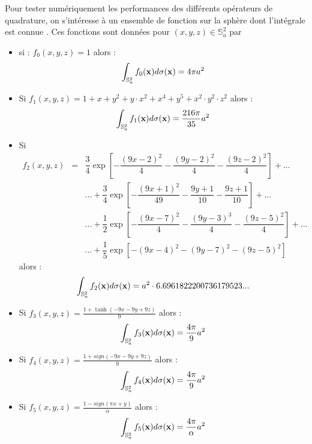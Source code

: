 Pour tester numériquement les performances des différents opérateurs de quadrature, on s’intéresse à un ensemble de fonction sur la sphère dont l'intégrale est connue \cite{Fornberg2014}. Ces fonctions sont données pour $(x,y,z) \in \mathbb{S}_a^2$ par
\begin{itemize}
\item si : $f_0(x,y,z)=1$ alors :
\begin{equation}
\displaystyle\int_{\mathbb{S}_a^2} f_0(\mathbf{x}) d\sigma (\mathbf{x})=4 \pi a^2
\end{equation}
\item Si $f_1(x,y,z)=1+x+y^2+y\cdot x^2+x^4+y^5+x^2 \cdot y^2 \cdot z^2$ alors :
\begin{equation}
\displaystyle\int_{\mathbb{S}_a^2} f_1(\mathbf{x}) d\sigma (\mathbf{x})=\dfrac{216 \pi}{35} a^2
\end{equation}
\item Si 
\begin{equation}
\begin{array}{rcl}
f_2(x,y,z) & = & \dfrac{3}{4} \exp \left[ - \dfrac{(9x-2)^2}{4} - \dfrac{(9y-2)^2}{4} - \dfrac{(9z-2)^2}{4} \right] + ...\\
& & ... + \dfrac{3}{4} \exp \left[ - \dfrac{(9x+1)^2}{49} - \dfrac{9y+1}{10} - \dfrac{9z+1}{10} \right] + ...\\
& & ... + \dfrac{1}{2} \exp \left[ - \dfrac{(9x-7)^2}{4} - \dfrac{(9y-3)^3}{4} - \dfrac{(9z-5)^2}{4} \right] + ...\\
& &... + \dfrac{1}{5} \exp \left[ - (9x-4)^2 - (9y-7)^2 - (9z-5)^2 \right]
\end{array}
\end{equation}
alors :
\begin{equation}
\displaystyle\int_{\mathbb{S}_a^2} f_2(\mathbf{x}) d\sigma (\mathbf{x})=a^2 \cdot 6.6961822200736179523...
\end{equation}
\item Si $f_3(x,y,z)=\frac{1+\tanh(-9x-9y+9z)}{9}$ alors :
\begin{equation}
\displaystyle\int_{\mathbb{S}_a^2} f_3(\mathbf{x}) d\sigma (\mathbf{x})=\frac{4\pi}{9} a^2
\end{equation}
\item Si $f_4(x,y,z)=\frac{1+sign(-9x-9y+9z)}{9}$ alors :
\begin{equation}
\displaystyle\int_{\mathbb{S}_a^2} f_4(\mathbf{x}) d\sigma (\mathbf{x})=\frac{4\pi}{9} a^2
\end{equation}
\item Si $f_5(x,y,z)=\frac{1-sign(\pi x + y)}{\alpha}$ alors :
\begin{equation}
\displaystyle\int_{\mathbb{S}_a^2} f_5(\mathbf{x}) d\sigma (\mathbf{x})=\frac{4\pi}{\alpha} a^2
\end{equation}
\end{itemize}

